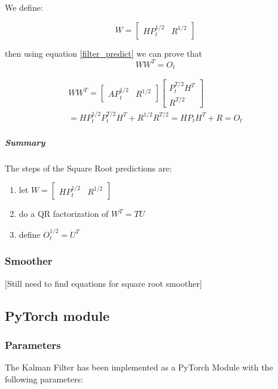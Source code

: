 \documentclass{article}
\let\Oldsubsection\subsection
\renewcommand{\subsection}{\FloatBarrier\Oldsubsection}
\let\Oldsubsubsection\subsubsection
\renewcommand{\subsubsection}{\FloatBarrier\Oldsubsubsection}
\begin{document}
We define:

\begin{equation}
    W = \begin{bmatrix}HP_{t}^{1/2} & R^{1/2}\end{bmatrix}
\end{equation}

then using equation \ref{filter_predict} we can prove that
\begin{equation}\label{predict_SR_mult}
WW^T = O_t 
\end{equation}

\begin{multline}
  WW^T =  \begin{bmatrix}AP_{t}^{1/2} & R^{1/2}\end{bmatrix}\begin{bmatrix}P_{t}^{T/2}H^T \\ R^{T/2}\end{bmatrix}\\
  = HP_{t}^{1/2}P_{t}^{T/2}H^T + R^{1/2}R^{T/2} = HP_{t}H^T + R = O_t
\end{multline}

\subparagraph{Summary} The steps of the Square Root predictions are:

\begin{enumerate}
    \item let  $W = \begin{bmatrix}HP_t^{1/2} & R^{1/2}\end{bmatrix}$
    \item do a QR factorization of $W^T=TU$
    \item define $O_t^{1/2} = U^T$
\end{enumerate}

\subsubsection{Smoother}

[Still need to find equations for square root smoother]

\subsection{PyTorch module}


\subsubsection{Parameters}

The Kalman Filter has been implemented as a PyTorch Module with the following parameters:
\end{document}
